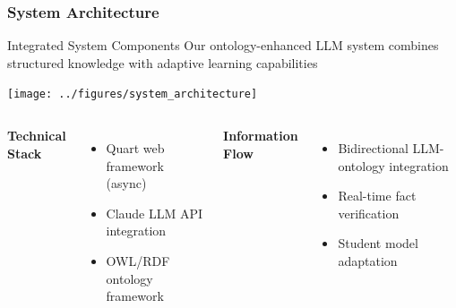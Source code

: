 \documentclass{beamer}
\begin{document}
\begin{frame}
\frametitle{System Architecture}

\begin{block}{Integrated System Components}
Our ontology-enhanced LLM system combines structured knowledge with adaptive learning capabilities
\end{block}

\begin{center}
\texttt{[image: ../figures/system\_architecture]}
\end{center}

\begin{columns}

\textbf{Technical Stack}
\begin{itemize}
    \item Quart web framework (async)
    \item Claude LLM API integration
    \item OWL/RDF ontology framework
\end{itemize}

\textbf{Information Flow}
\begin{itemize}
    \item Bidirectional LLM-ontology integration
    \item Real-time fact verification
    \item Student model adaptation
\end{itemize}

\end{columns}
\end{frame}
\end{document}
